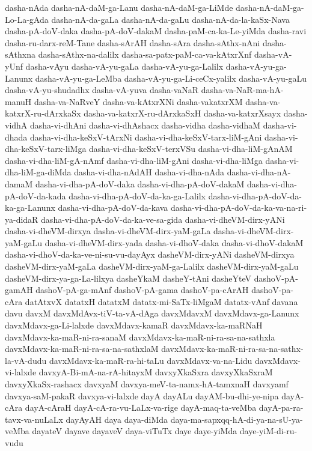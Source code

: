{dasha-nAda
dasha-nA-daM-ga-Lanu
dasha-nA-daM-ga-LiMde
dasha-nA-daM-ga-Lo-La-gAda
dasha-nA-da-gaLa
dasha-nA-da-gaLu
dasha-nA-da-la-kaSx-Nava
dasha-pA-doV-daka
dasha-pA-doV-dakaM
dasha-paM-ca-ka-Le-yiMda
dasha-ravi
dasha-ru-darx-reM-Tane
dasha-sArAH
dasha-sAra
dasha-sAthx-nAni
dasha-sAthxna
dasha-sAthx-na-dalilx
dasha-sa-patx-paM-ca-va-kAtxrXnf
dasha-vA-yUnf
dasha-vAyu
dasha-vA-yu-gaLa
dasha-vA-yu-ga-Lalilx
dasha-vA-yu-ga-Lanunx
dasha-vA-yu-ga-LeMba
dasha-vA-yu-ga-Li-ceCx-yalilx
dasha-vA-yu-gaLu
dasha-vA-yu-shudadhx
dasha-vA-yuva
dasha-vaNaR
dasha-va-NaR-ma-hA-manuH
dasha-va-NaRveY
dasha-va-kAtxrXNi
dasha-vakatxrXM
dasha-va-katxrX-ru-dArxkaSx
dasha-va-katxrX-ru-dArxkaSxH
dasha-va-katxrXsayx
dasha-vidhA
dasha-vi-dhAni
dasha-vi-dhAshacx
dasha-vidha
dasha-vidhaM
dasha-vi-dhada
dasha-vi-dha-keSxV-tArxNi
dasha-vi-dha-keSxV-tarx-liM-gAni
dasha-vi-dha-keSxV-tarx-liMga
dasha-vi-dha-keSxV-terxVSu
dasha-vi-dha-liM-gAnAM
dasha-vi-dha-liM-gA-nAmf
dasha-vi-dha-liM-gAni
dasha-vi-dha-liMga
dasha-vi-dha-liM-ga-diMda
dasha-vi-dha-nAdAH
dasha-vi-dha-nAda
dasha-vi-dha-nA-damaM
dasha-vi-dha-pA-doV-daka
dasha-vi-dha-pA-doV-dakaM
dasha-vi-dha-pA-doV-da-kada
dasha-vi-dha-pA-doV-da-ka-ga-Lalilx
dasha-vi-dha-pA-doV-da-ka-ga-Lanunx
dasha-vi-dha-pA-doV-da-kava
dasha-vi-dha-pA-doV-da-ka-va-na-ri-ya-didaR
dasha-vi-dha-pA-doV-da-ka-ve-sa-gida
dasha-vi-dheVM-dirx-yANi
dasha-vi-dheVM-dirxya
dasha-vi-dheVM-dirx-yaM-gaLa
dasha-vi-dheVM-dirx-yaM-gaLu
dasha-vi-dheVM-dirx-yada
dasha-vi-dhoV-daka
dasha-vi-dhoV-dakaM
dasha-vi-dhoV-da-ka-ve-ni-su-vu-dayAyx
dasheVM-dirx-yANi
dasheVM-dirxya
dasheVM-dirx-yaM-gaLa
dasheVM-dirx-yaM-ga-Lalilx
dasheVM-dirx-yaM-gaLu
dasheVM-dirx-ya-ga-La-lilxya
dasheYkaM
dasheY-tAni
dasheYteV
dashoV-pA-gamAH
dashoV-pA-ga-mAnf
dashoV-pA-gama
dashoV-pa-cArAH
dashoV-pa-cAra
datAtxvX
datatxH
datatxM
datatx-mi-SaTx-liMgaM
datatx-vAnf
davana
davu
davxM
davxMdAvx-tiV-ta-vA-dAga
davxMdavxM
davxMdavx-ga-Lanunx
davxMdavx-ga-Li-lalxde
davxMdavx-kamaR
davxMdavx-ka-maRNaH
davxMdavx-ka-maR-ni-ra-sanaM
davxMdavx-ka-maR-ni-ra-sa-na-sathxla
davxMdavx-ka-maR-ni-ra-sa-na-sathxlaM
davxMdavx-ka-maR-ni-ra-sa-na-sathx-la-vA-dudu
davxMdavx-ka-maR-ra-hi-taLu
davxMdavx-va-na-Lidu
davxMdavx-vi-lalxde
davxyA-Bi-mA-na-rA-hitayxM
davxyXkaSxra
davxyXkaSxraM
davxyXkaSx-rashacx
davxyaM
davxya-meV-ta-namx-hA-tamxnaH
davxyamf
davxya-saM-pakaR
davxya-vi-lalxde
dayA
dayALu
dayAM-bu-dhi-ye-nipa
dayA-cAra
dayA-cAraH
dayA-cA-ra-vu-LaLx-va-rige
dayA-maq-ta-veMba
dayA-pa-ra-tavx-va-nuLaLx
dayAyAH
daya
daya-diMda
daya-ma-sapxqq-hA-di-ya-na-sU-ya-veMba
dayateV
dayave
dayaveV
daya-viTuTx
daye
daye-yiMda
daye-yiM-di-ru-vudu
}
